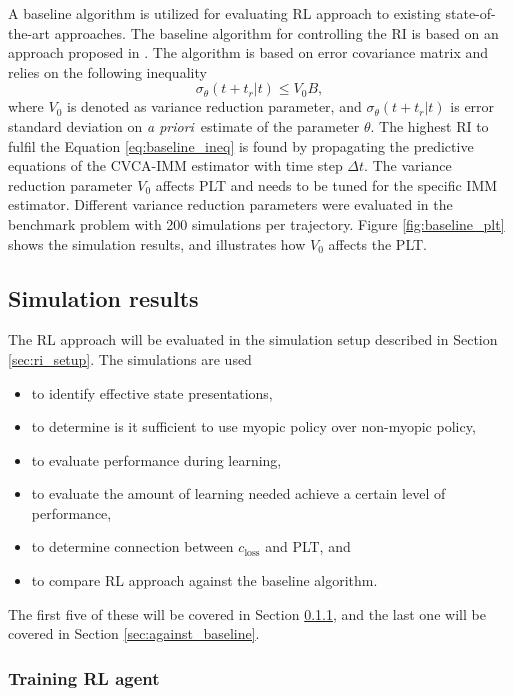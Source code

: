 \documentclass[english, 12pt, a4paper, elec, utf8, a-1b, online]{aaltothesis}
\def\prior{\textit{a priori}\ }
\newcommand{\dt}{\Delta t}
\newcommand{\closs}{c_\text{loss}}
\begin{document}
A baseline algorithm is utilized for evaluating RL approach to existing state-of-the-art approaches. 
The baseline algorithm for controlling the RI is based on an approach proposed in \cite{Daeipour1994}.
The algorithm is based on error covariance matrix and relies on the following inequality
\begin{equation}\label{eq:baseline_ineq}
    \sigma_\theta(t+t_r|t) \leq V_0 B, 
\end{equation}
where $V_0$ is denoted as variance reduction parameter, and $\sigma_\theta(t+t_r|t)$ is error standard deviation on \prior estimate of the parameter $\theta$.
The highest RI to fulfil the Equation \eqref{eq:baseline_ineq} is found by propagating the predictive equations of the CVCA-IMM estimator with time step $\dt$.
The variance reduction parameter $V_0$ affects PLT and needs to be tuned for the specific IMM estimator.
Different variance reduction parameters were evaluated in the benchmark problem with 200 simulations per trajectory.
Figure \ref{fig:baseline_plt} shows the simulation results, and illustrates how $V_0$ affects the PLT. 


\subsection{Simulation results}\label{sec:ri_sim}

The RL approach will be evaluated in the simulation setup described in Section \ref{sec:ri_setup}.
The simulations are used
\begin{itemize}
    \item to identify effective state presentations,
    \item to determine is it sufficient to use myopic policy over non-myopic policy,
    \item to evaluate performance during learning,
    \item to evaluate the amount of learning needed achieve a certain level of performance,
    \item to determine connection between $\closs$ and PLT, and
    \item to compare RL approach against the baseline algorithm.
\end{itemize}
The first five of these will be covered in Section \ref{sec:training}, and the last one will be covered in Section \ref{sec:against_baseline}.

\subsubsection{Training RL agent}\label{sec:training}
\end{document}
